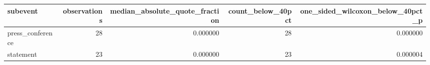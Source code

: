 \begin{tabular}{lrrrr}
\toprule
subevent & observations & median_absolute_quote_fraction & count_below_40pct & one_sided_wilcoxon_below_40pct_p \\
\midrule
press_conference & 28 & 0.000000 & 28 & 0.000000 \\
statement & 23 & 0.000000 & 23 & 0.000004 \\
\bottomrule
\end{tabular}
